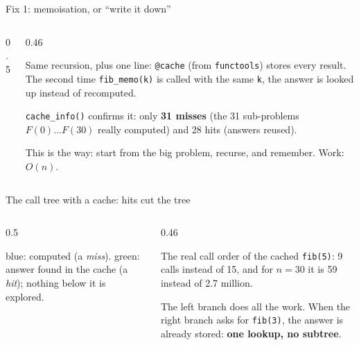 \documentclass[aspectratio=169,10pt]{beamer}
\begin{document}
\begin{frame}{Fix 1: memoisation, or ``write it down''}
\begin{columns}[T]
\begin{column}{0.5\textwidth}
\vspace{2mm}
\end{column}
\begin{column}{0.46\textwidth}
{\small
Same recursion, plus one line: \texttt{@cache} (from \texttt{functools}) stores every result. The second time \texttt{fib\_memo(k)} is called with the same \texttt{k}, the answer is looked up instead of recomputed.

\vspace{2mm}
\texttt{cache\_info()} confirms it: only \textbf{31 misses} (the 31 sub-problems $F(0)\ldots F(30)$ really computed) and 28 hits (answers reused).

\vspace{2mm}
This is the  way: start from the big problem, recurse, and remember. Work: $O(n)$.}
\end{column}
\end{columns}
\end{frame}

\begin{frame}{The call tree with a cache: hits cut the tree}
\begin{columns}[T]
\begin{column}{0.5\textwidth}
\begin{sfig}[0.7]
\end{sfig}
\vspace{1mm}
{\small \colorbox{tdBlue!12}{blue}: computed (a \emph{miss}). \colorbox{tdGreen!40}{green}: answer found in the cache (a \emph{hit}); nothing below it is explored.}
\end{column}
\begin{column}{0.46\textwidth}
\vspace{2mm}
{\small
The real call order of the cached \texttt{fib(5)}: 9 calls instead of 15, and for $n=30$ it is 59 instead of 2.7 million.

\vspace{1mm}
The left branch does all the work. When the right branch asks for \texttt{fib(3)}, the answer is already stored: \textbf{one lookup, no subtree}.}
\end{column}
\end{columns}
\end{frame}
\end{document}
